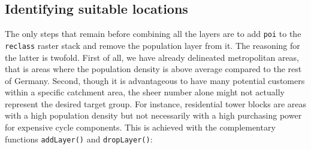 \documentclass[]{krantz}
\newenvironment{Shaded}{\begin{snugshade}}{\end{snugshade}}
\newcommand{\CommentTok}[1]{\textcolor[rgb]{0.37,0.37,0.37}{\textit{#1}}}
\newcommand{\DataTypeTok}[1]{\textcolor[rgb]{0.27,0.27,0.27}{#1}}
\newcommand{\DecValTok}[1]{\textcolor[rgb]{0.06,0.06,0.06}{#1}}
\newcommand{\KeywordTok}[1]{\textcolor[rgb]{0.27,0.27,0.27}{\textbf{#1}}}
\newcommand{\NormalTok}[1]{#1}
\newcommand{\OperatorTok}[1]{\textcolor[rgb]{0.43,0.43,0.43}{\textbf{#1}}}
\newcommand{\OtherTok}[1]{\textcolor[rgb]{0.37,0.37,0.37}{#1}}
\newcommand{\StringTok}[1]{\textcolor[rgb]{0.5,0.5,0.5}{#1}}
\begin{document}
\begin{Shaded}
\end{Shaded}

\hypertarget{identifying-suitable-locations}{%
\subsection{Identifying suitable locations}\label{identifying-suitable-locations}}

The only steps that remain before combining all the layers are to add \texttt{poi} to the \texttt{reclass} raster stack and remove the population layer from it.
The reasoning for the latter is twofold.
First of all, we have already delineated metropolitan areas, that is areas where the population density is above average compared to the rest of Germany.
Second, though it is advantageous to have many potential customers within a specific catchment area, the sheer number alone might not actually represent the desired target group.
For instance, residential tower blocks are areas with a high population density but not necessarily with a high purchasing power for expensive cycle components.
This is achieved with the complementary functions \texttt{addLayer()} and \texttt{dropLayer()}:
\end{document}
